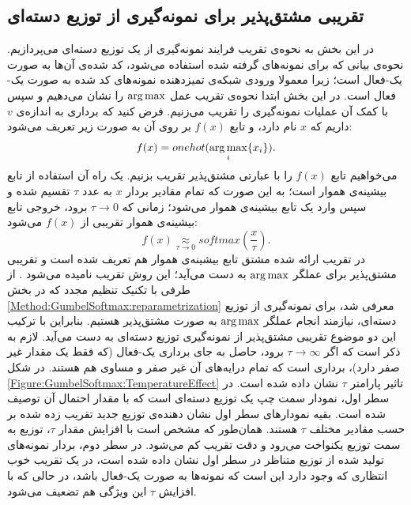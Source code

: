 \subsection{ تقریبی مشتق‌پذیر برای نمونه‌گیری از توزیع دسته‌ای}
	\label{Method:GumbelSoftmax:ArgmaxApprox}
	در این بخش به نحوه‌ی تقریب فرایند نمونه‌گیری از یک توزیع دسته‌ای می‌پردازیم. نحوه‌ی بیانی که برای نمونه‌های گرفته شده استفاده می‌شود، کد شده‌ی آن‌ها به صورت یک-فعال
	است؛ زیرا معمولا ورودی شبکه‌ی تمیزدهنده نمونه‌های کد شد‌ه به صورت یک-فعال است.
در این بخش ابتدا نحوه‌ی تقریب عمل
$\operatorname*{arg\,max}$
را نشان می‌دهیم و سپس با کمک آن عملیات نمونه‌گیری را تقریب می‌زنیم.
\newline
فرض کنید که برداری به اندازه‌ی $v$ داریم که $x$ نام دارد، و تابع $f(x)$ بر روی آن به صورت زیر تعریف می‌‌شود:
\begin{equation}
f(x) = onehot(\displaystyle \operatorname*{arg\,max}_i \{x_i\}).
\end{equation}
می‌خواهیم تابع 
$f(x)$
را با عبارتی مشتق‌پذیر تقریب بزنیم. یک راه آن استفاده از تابع بیشینه‌ی هموار است؛ به این صورت که تمام مقادیر بردار $x$ به عدد $\tau$ تقسیم شده و سپس وارد یک تابع بیشینه‌ی هموار می‌شود؛ زمانی که 
$\tau \rightarrow 0$
برود، خروجی  تابع بیشینه‌ی هموار تقریبی از 
$f(x)$
می‌شود:
\begin{equation}
f(x) \underset{\tau \rightarrow 0}{\approx} softmax(\frac{x}{\tau}).
\end{equation}
در تقریب ارائه شده مشتق تابع بیشینه‌ی هموار هم تعریف شده است و تقریبی مشتق‌پذیر برای عملگر
$\operatorname*{arg\,max}$
به دست می‌آید؛ این روش تقریب
نامیده می‌شود
\cite{JanGuPoo17}.
\newline
از طرفی با تکنیک تنظیم مجدد که در بخش
\ref{Method:GumbelSoftmax:reparametrization}
 معرفی شد، برای نمونه‌گیری از توزیع دسته‌ای، نیازمند انجام عملگر
$\operatorname*{arg\,max}$
به صورت مشتق‌پذیر هستیم.
بنابراین با ترکیب این دو موضوع تقریبی مشتق‌پذیر از نمونه‌گیری توزیع دسته‌ای به دست می‌آید.
\newline
لازم به ذکر است که اگر 
$\tau \rightarrow \infty$
برود، حاصل به جای برداری یک-فعال (که فقط یک مقدار غیر صفر دارد)، برداری است که تمام درایه‌های آن غیر صفر و مساوی هم هستند.
در شکل
\ref{Figure:GumbelSoftmax:TemperatureEffect}
تاثیر پارامتر $\tau$ نشان داده شده است. 
در سطر اول، نمودار سمت چپ یک توزیع دسته‌ای است که با مقدار احتمال آن توصیف شده است. بقیه نمودار‌های سطر اول نشان دهنده‌ی توزیع جدید تقریب زده شده بر حسب مقادیر مختلف $\tau$ هستند.
همان‌طور که مشخص است با افزایش مقدار $\tau$، توزیع به سمت توزیع یکنواخت می‌رود و دقت تقریب کم می‌شود.
در سطر دوم،  بردار نمونه‌های تولید شده از توزیع متناظر در سطر اول نشان داده شده است، در یک تقریب خوب انتظاری که وجود دارد این است که نمونه‌ها به صورت یک-فعال باشد، در حالی که با افزایش $\tau$ این ویژگی هم تضعیف می‌شود.
